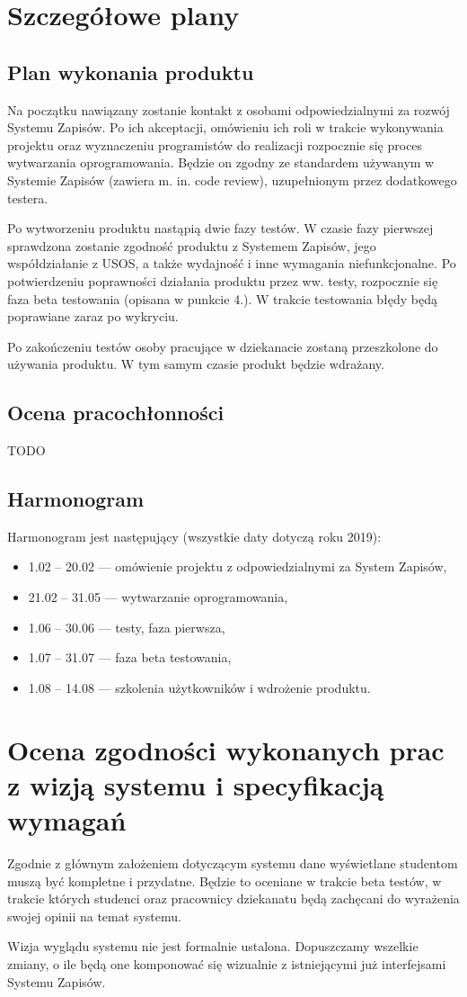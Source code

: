 \documentclass{article}
\begin{document}
\section{Szczegółowe plany}
\subsection{Plan wykonania produktu}
Na początku nawiązany zostanie kontakt z osobami odpowiedzialnymi za rozwój Systemu Zapisów.
Po ich akceptacji, omówieniu ich roli w trakcie wykonywania projektu oraz wyznaczeniu programistów do realizacji rozpocznie się proces wytwarzania oprogramowania.
Będzie on zgodny ze standardem używanym w Systemie Zapisów (zawiera m. in. code review), uzupełnionym przez dodatkowego testera.

Po wytworzeniu produktu nastąpią dwie fazy testów.
W czasie fazy pierwszej sprawdzona zostanie zgodność produktu z Systemem Zapisów, jego współdziałanie z USOS, a także wydajność i inne wymagania niefunkcjonalne.
Po potwierdzeniu poprawności działania produktu przez ww. testy, rozpocznie się faza beta testowania (opisana w punkcie 4.).
W trakcie testowania błędy będą poprawiane zaraz po wykryciu.

Po zakończeniu testów osoby pracujące w dziekanacie zostaną przeszkolone do używania produktu.
W tym samym czasie produkt będzie wdrażany.

\subsection{Ocena pracochłonności}
TODO

\subsection{Harmonogram}
Harmonogram jest następujący (wszystkie daty dotyczą roku 2019):
\begin{itemize}
 \item 1.02 -- 20.02 --- omówienie projektu z odpowiedzialnymi za System Zapisów,
 \item 21.02 -- 31.05 --- wytwarzanie oprogramowania,
 \item 1.06 -- 30.06 --- testy, faza pierwsza,
 \item 1.07 -- 31.07 --- faza beta testowania,
 \item 1.08 -- 14.08 --- szkolenia użytkowników i wdrożenie produktu.
\end{itemize}

\section{Ocena zgodności wykonanych prac z wizją systemu i specyfikacją wymagań}
Zgodnie z głównym założeniem dotyczącym systemu dane wyświetlane studentom muszą być kompletne i przydatne.
Będzie to oceniane w trakcie beta testów, w trakcie których studenci oraz pracownicy dziekanatu będą zachęcani do wyrażenia swojej opinii na temat systemu.

Wizja wyglądu systemu nie jest formalnie ustalona.
Dopuszczamy wszelkie zmiany, o ile będą one komponować się wizualnie z istniejącymi już interfejsami Systemu Zapisów.
\end{document}
